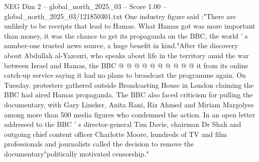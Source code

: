 \begin{textsample}{NEG Dim 2 – global\_north\_2025\_03 – Score 1.00 – global\_north\_2025\_03/121850301.txt}
One industry figure said :"There are unlikely to be receipts that lead to Hamas.
What Hamas got was more important than money, it was the chance to get its propaganda on the BBC, the world ' s number-one trusted news source, a huge benefit in kind."After the discovery about Abdullah al-Yazouri, who speaks about life in the territory amid the war between Israel and Hamas, the BBC @ @ @ @ @ @ @ @ @ @ it from its online catch-up service saying it had no plans to broadcast the programme again.
On Tuesday, protesters gathered outside Broadcasting House in London claiming the BBC had aired Hamas propaganda.
The BBC also faced criticism for pulling the documentary, with Gary Lineker, Anita Rani, Riz Ahmed and Miriam Margolyes among more than 500 media figures who condemned the action.
In an open letter addressed to the BBC ' s director-general Tim Davie, chairman Dr Shah and outgoing chief content officer Charlotte Moore, hundreds of TV and film professionals and journalists called the decision to remove the documentary"politically motivated censorship."

\end{textsample}
